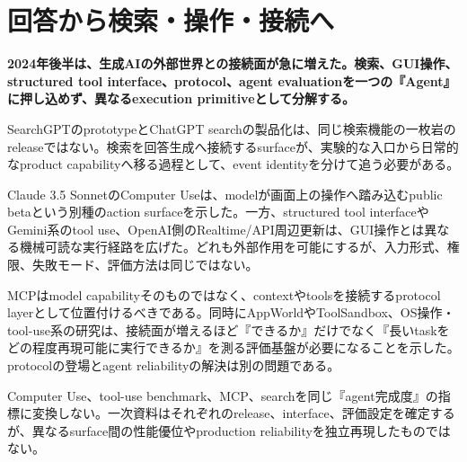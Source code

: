 \section{回答から検索・操作・接続へ}
\label{pkg:action-connectivity}
\noindent\textbf{2024年後半は、生成AIの外部世界との接続面が急に増えた。検索、GUI操作、structured tool interface、protocol、agent evaluationを一つの『Agent』に押し込めず、異なるexecution primitiveとして分解する。}\autocite{src-6cafd8cf5668,src-9e4ef9c155b6}

SearchGPTのprototypeとChatGPT searchの製品化は、同じ検索機能の一枚岩のreleaseではない。検索を回答生成へ接続するsurfaceが、実験的な入口から日常的なproduct capabilityへ移る過程として、event identityを分けて追う必要がある。\autocite{src-6cafd8cf5668,src-bd5105ccfa25}


Claude 3.5 SonnetのComputer Useは、modelが画面上の操作へ踏み込むpublic betaという別種のaction surfaceを示した。一方、structured tool interfaceやGemini系のtool use、OpenAI側のRealtime/API周辺更新は、GUI操作とは異なる機械可読な実行経路を広げた。どれも外部作用を可能にするが、入力形式、権限、失敗モード、評価方法は同じではない。\autocite{src-9e4ef9c155b6,src-a38408fd5407,src-e283b9c34207,src-ed98251ab05d}


MCPはmodel capabilityそのものではなく、contextやtoolsを接続するprotocol layerとして位置付けるべきである。同時にAppWorldやToolSandbox、OS操作・tool-use系の研究は、接続面が増えるほど『できるか』だけでなく『長いtaskをどの程度再現可能に実行できるか』を測る評価基盤が必要になることを示した。protocolの登場とagent reliabilityの解決は別の問題である。\autocite{src-0d67af76cfef,src-395ebe20f9b0,src-5ad3266ea448,src-7afacff558f5}


\begin{claimboundary}
Computer Use、tool-use benchmark、MCP、searchを同じ『agent完成度』の指標に変換しない。一次資料はそれぞれのrelease、interface、評価設定を確定するが、異なるsurface間の性能優位やproduction reliabilityを独立再現したものではない。\autocite{src-9e4ef9c155b6}
\end{claimboundary}
